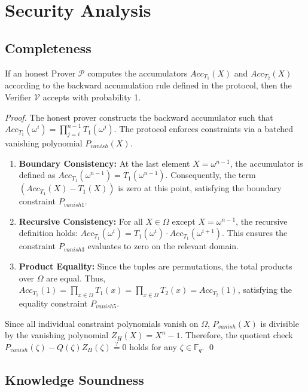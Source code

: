 \documentclass{llncs}
\begin{document}
\section{Security Analysis}

\subsection{Completeness}

\begin{theorem}[Completeness]
    If an honest Prover $\mathcal{P}$ computes the accumulators $Acc_{T_1}(X)$ and $Acc_{T_2}(X)$ according to the backward accumulation rule defined in the protocol, then the Verifier $\mathcal{V}$ accepts with probability 1.
\end{theorem}

\begin{proof}
    The honest prover constructs the backward accumulator such that $Acc_{T_1}(\omega^i) = \prod_{j=i}^{n-1} T_1(\omega^j)$. The protocol enforces constraints via a batched vanishing polynomial $P_{vanish}(X)$.
    \begin{enumerate}
        \item \textbf{Boundary Consistency:} At the last element $X = \omega^{n-1}$, the accumulator is defined as $Acc_{T_1}(\omega^{n-1}) = T_1(\omega^{n-1})$. Consequently, the term $(Acc_{T_1}(X) - T_1(X))$ is zero at this point, satisfying the boundary constraint $P_{vanish1}$.
        \item \textbf{Recursive Consistency:} For all $X \in \Omega$ except $X=\omega^{n-1}$, the recursive definition holds: $Acc_{T_1}(\omega^i) = T_1(\omega^i) \cdot Acc_{T_1}(\omega^{i+1})$. This ensures the constraint $P_{vanish3}$ evaluates to zero on the relevant domain.
        \item \textbf{Product Equality:} Since the tuples are permutations, the total products over $\Omega$ are equal. Thus, $Acc_{T_1}(1) = \prod_{x \in \Omega} T_1(x) = \prod_{x \in \Omega} T_2(x) = Acc_{T_2}(1)$, satisfying the equality constraint $P_{vanish5}$.
    \end{enumerate}
    Since all individual constraint polynomials vanish on $\Omega$, $P_{vanish}(X)$ is divisible by the vanishing polynomial $Z_H(X) = X^n - 1$. Therefore, the quotient check $P_{vanish}(\zeta) - Q(\zeta)Z_H(\zeta) \stackrel{?}{=} 0$ holds for any $\zeta \in \mathbb{F}_q$.
    \qed
\end{proof}

\subsection{Knowledge Soundness}
\end{document}
